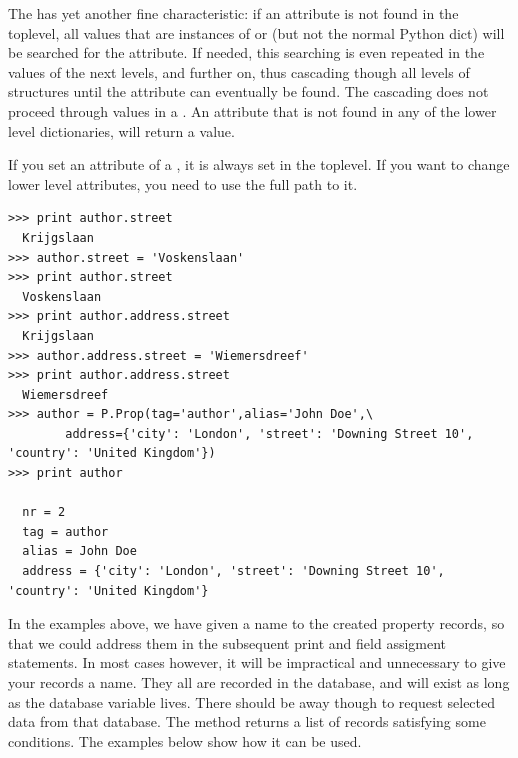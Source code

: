 The  has yet another fine characteristic: if an attribute is not found in the toplevel, all values that are instances of  or  (but not the normal Python dict) will be searched for the attribute. If needed, this searching is even repeated in the values of the next levels, and further on, thus cascading though all levels of  structures until the attribute can eventually be found. The cascading does not proceed through values in a . An attribute that is not found in any of the lower level dictionaries, will return a  value.

If you set an attribute of a , it is always set in the toplevel. If you want to change lower level attributes, you need to use the full path to it.
\begin{verbatim}
>>> print author.street
  Krijgslaan
>>> author.street = 'Voskenslaan'
>>> print author.street
  Voskenslaan
>>> print author.address.street
  Krijgslaan
>>> author.address.street = 'Wiemersdreef'
>>> print author.address.street
  Wiemersdreef
>>> author = P.Prop(tag='author',alias='John Doe',\
        address={'city': 'London', 'street': 'Downing Street 10', 'country': 'United Kingdom'})
>>> print author

  nr = 2
  tag = author
  alias = John Doe
  address = {'city': 'London', 'street': 'Downing Street 10', 'country': 'United Kingdom'} 
\end{verbatim}

In the examples above, we have given a name to the created property records, so that we could address them in the subsequent print and field assigment statements. In most cases however, it will be impractical and unnecessary to give your records a name. They all are recorded in the  database, and will exist as long as the database variable lives. There should be away though to request selected data from that database. The  method returns a list of records satisfying some conditions. The examples below show how it can be used.

